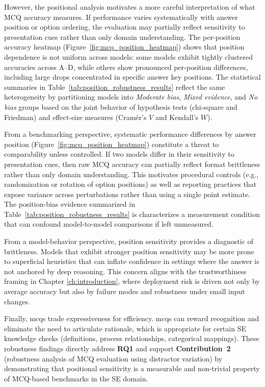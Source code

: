 However, the positional analysis motivates a more careful interpretation of what MCQ accuracy measures. If performance varies systematically with answer position or option ordering, the evaluation may partially reflect sensitivity to presentation cues rather than only domain understanding. The per-position accuracy heatmap (Figure~\ref{fig:mcq_position_heatmap}) shows that position dependence is not uniform across models: some models exhibit tightly clustered accuracies across A--D, while others show pronounced per-position differences, including large drops concentrated in specific answer key positions. The statistical summaries in Table~\ref{tab:position_robustness_results} reflect the same heterogeneity by partitioning models into \emph{Moderate bias}, \emph{Mixed evidence}, and \emph{No bias} groups based on the joint behavior of hypothesis tests (chi-square and Friedman) and effect-size measures (Cram\'er's $V$ and Kendall's $W$).

From a benchmarking perspective, systematic performance differences by answer position (Figure~\ref{fig:mcq_position_heatmap}) constitute a threat to comparability unless controlled. If two models differ in their sensitivity to presentation cues, then raw MCQ accuracy can partially reflect format brittleness rather than only domain understanding. This motivates procedural controls (e.g., randomization or rotation of option positions) as well as reporting practices that expose variance across perturbations rather than using a single point estimate. The position-bias evidence summarized in Table~\ref{tab:position_robustness_results} is characterizes a measurement condition that can confound model-to-model comparisons if left unmeasured.

From a model-behavior perspective, position sensitivity provides a diagnostic of brittleness. Models that exhibit stronger position sensitivity may be more prone to superficial heuristics that can inflate confidence in settings where the answer is not anchored by deep reasoning. This concern aligns with the trustworthiness framing in Chapter \ref{ch:introduction}, where deployment risk is driven not only by average accuracy but also by failure modes and robustness under small input changes.

Finally, \acp{mcq} trade expressiveness for efficiency. \acp{mcq} can reward recognition and eliminate the need to articulate rationale, which is appropriate for certain SE knowledge checks (definitions, process relationships, categorical mappings). These robustness findings directly address \textbf{RQ1} and support \textbf{Contribution~2} (robustness analysis of MCQ evaluation using distractor variation) by demonstrating that positional sensitivity is a measurable and non-trivial property of MCQ-based benchmarks in the SE domain.

